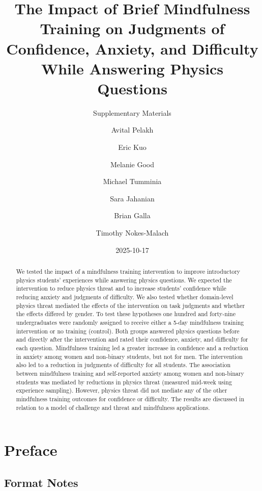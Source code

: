 \documentclass[
  letterpaper,
  DIV=11,
  numbers=noendperiod]{scrreprt}
\title{The Impact of Brief Mindfulness Training on Judgments of
Confidence, Anxiety, and Difficulty While Answering Physics Questions}
\subtitle{Supplementary Materials}
\author{Avital Pelakh \and Eric Kuo \and Melanie Good \and Michael
Tumminia \and Sara Jahanian \and Brian Galla \and Timothy Nokes-Malach}
\date{2025-10-17}
\renewcommand*\contentsname{Table of contents}
\newcommand\contentsname{Table of contents}
\begin{document}
\maketitle
\begin{abstract}
We tested the impact of a mindfulness training intervention to improve
introductory physics students' experiences while answering physics
questions. We expected the intervention to reduce physics threat and to
increase students' confidence while reducing anxiety and judgments of
difficulty. We also tested whether domain-level physics threat mediated
the effects of the intervention on task judgments and whether the
effects differed by gender. To test these hypotheses one hundred and
forty-nine undergraduates were randomly assigned to receive either a
5-day mindfulness training intervention or no training (control). Both
groups answered physics questions before and directly after the
intervention and rated their confidence, anxiety, and difficulty for
each question. Mindfulness training led a greater increase in confidence
and a reduction in anxiety among women and non-binary students, but not
for men. The intervention also led to a reduction in judgments of
difficulty for all students. The association between mindfulness
training and self-reported anxiety among women and non-binary students
was mediated by reductions in physics threat (measured mid-week using
experience sampling). However, physics threat did not mediate any of the
other mindfulness training outcomes for confidence or difficulty. The
results are discussed in relation to a model of challenge and threat and
mindfulness applications.
\end{abstract}

\renewcommand*\contentsname{Table of contents}
{
\hypersetup{linkcolor=}
\setcounter{tocdepth}{2}
\tableofcontents
}


\chapter*{Preface}\label{preface}


\section*{Format Notes}\label{format-notes}
\end{document}
